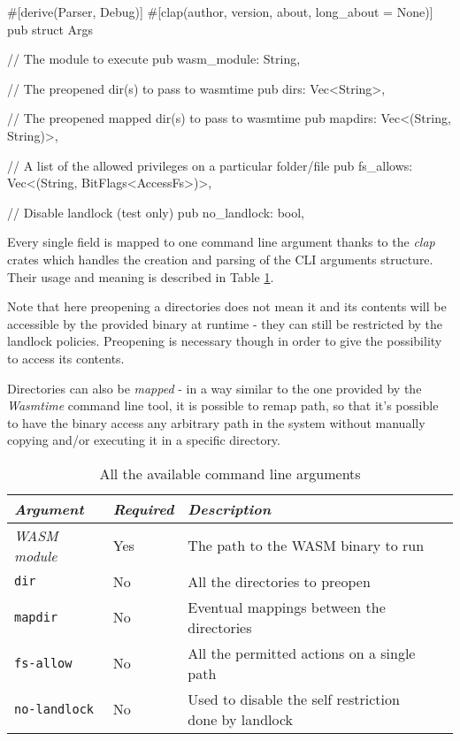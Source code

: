 \begin{code}[language=rust, caption=The \texttt{Args} struct, label=lst:arg-struct]
  #[derive(Parser, Debug)]
  #[clap(author, version, about, long_about = None)]
  pub struct Args {
    // The module to execute
    pub wasm_module: String,

    // The preopened dir(s) to pass to wasmtime
    pub dirs: Vec<String>,

    // The preopened mapped dir(s) to pass to wasmtime
    pub mapdirs: Vec<(String, String)>,

    // A list of the allowed privileges on a particular folder/file
    pub fs_allows: Vec<(String, BitFlags<AccessFs>)>,

    // Disable landlock (test only)
    pub no_landlock: bool,
  }
\end{code}

Every single field is mapped to one command line argument thanks to the \textit{clap} crates which handles the
creation and parsing of the CLI arguments structure.
Their usage and meaning is described in Table \ref{table:landlock-cli-args}.

Note that here preopening a directories does not mean it and its contents will be accessible by the
provided binary at runtime - they can still be restricted by the landlock policies. Preopening is
necessary though in order to give the possibility to access its contents.

Directories can also be \textit{mapped} - in a way similar to the one provided by the \textit{Wasmtime} command line tool,
it is possible to remap path, so that it's possible to have the binary access any arbitrary path in the system
without manually copying and/or executing it in a specific directory.

\begin{table}
  \centering
  \begin{tabular}{|l|l|l|l|}
    \hline
    \textit{Argument} & \textit{Required} & \textit{Description} \\
    \hline\hline
    \textit{WASM module} & Yes & The path to the WASM binary to run \\ \hline
    \texttt{dir} & No & All the directories to preopen \\ \hline
    \texttt{mapdir} & No & Eventual mappings between the directories \\ \hline
    \texttt{fs-allow} & No & All the permitted actions on a single path \\ \hline
    \texttt{no-landlock} & No & Used to disable the self restriction done by landlock \\
    \hline
  \end{tabular}
  \caption{All the available command line arguments}
  \label{table:landlock-cli-args}
\end{table}


